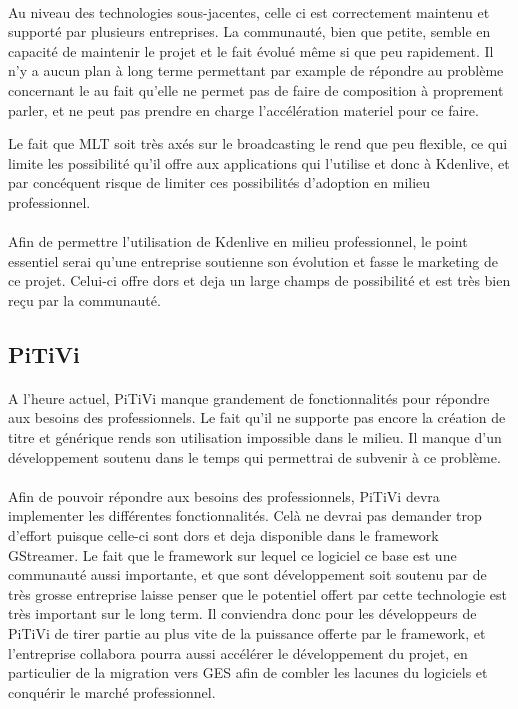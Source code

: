 \paragraph{}

Au niveau des technologies sous-jacentes, celle ci est correctement
maintenu et supporté par plusieurs entreprises. La communauté, bien que
petite, semble en capacité de maintenir le projet et le fait évolué
même si que peu rapidement. Il n'y a aucun plan à long terme permettant
par example de répondre au problème concernant le au fait qu'elle ne
permet pas de faire de composition à proprement parler, et ne peut pas
prendre en charge l'accélération materiel pour ce faire.

Le fait que MLT soit très axés sur le broadcasting le rend que peu
flexible, ce qui limite les possibilité qu'il offre aux applications
qui l'utilise et donc à Kdenlive, et par concéquent risque de limiter
ces possibilités d'adoption en milieu professionnel.

\paragraph{}

Afin de permettre l'utilisation de Kdenlive en milieu professionnel, le point
essentiel serai qu'une entreprise soutienne son évolution et fasse le
marketing de ce projet. Celui-ci offre dors et deja un large champs de
possibilité et est très bien reçu par la communauté.

\subsection {PiTiVi}

\paragraph{}

A l'heure actuel, PiTiVi manque grandement de fonctionnalités pour répondre
aux besoins des professionnels. Le fait qu'il ne supporte pas encore la création
de titre et générique rends son utilisation impossible dans le milieu. Il manque
d'un développement soutenu dans le temps qui permettrai de subvenir à ce problème.

\paragraph{}

Afin de pouvoir répondre aux besoins des professionnels, PiTiVi devra implementer
les différentes fonctionnalités. Celà ne devrai pas demander trop d'effort
puisque celle-ci sont dors et deja disponible dans le framework GStreamer. Le fait
que le framework sur lequel ce logiciel ce base est une communauté
aussi importante, et que sont développement soit soutenu par de très grosse entreprise
laisse penser que le potentiel offert par cette technologie est très important sur le
long term. Il conviendra donc pour les développeurs de PiTiVi de tirer partie au plus
vite de la puissance offerte par le framework, et l'entreprise collabora pourra aussi
accélérer le développement du projet, en particulier de la migration vers GES afin
de combler les lacunes du logiciels et conquérir le marché professionnel.
